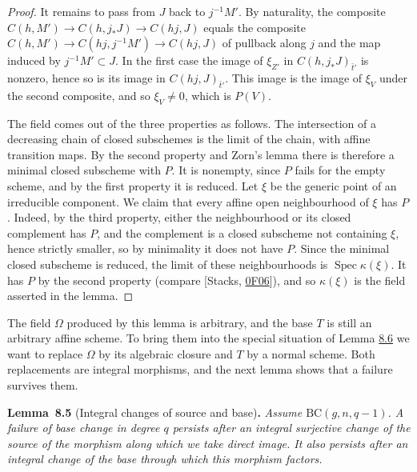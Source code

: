 \documentclass[11pt]{article}
\newenvironment{bpstatement}[2]{\par\addvspace{0.6\baselineskip}\noindent\textbf{#1}#2\textbf{.}\enspace\ignorespaces}
  {\par\addvspace{0.4\baselineskip}}
\newenvironment{bpstatementit}[2]{\begin{bpstatement}{#1}{#2}\itshape\ignorespaces}{\end{bpstatement}}
\begin{document}
\begin{proof}[{Proof}]
It remains to pass from \(J\) back to \(j^{-1}M'\). By naturality, the composite \(C(h,M')\to C(h,j_*J)\to C(hj,J)\) equals the composite \(C(h,M')\to C(hj,j^{-1}M')\to C(hj,J)\) of pullback along \(j\) and the map induced by \(j^{-1}M'\subset J\). In the first case the image of \(\xi_{Z'}\) in \(C(h,j_*J)_{\bar t'}\) is nonzero, hence so is its image in \(C(hj,J)_{\bar t'}\). This image is the image of \(\xi_V\) under the second composite, and so \(\xi_V\neq0\), which is \(P(V)\).

The field comes out of the three properties as follows. The intersection of a decreasing chain of closed subschemes is the limit of the chain, with affine transition maps. By the second property and Zorn's lemma there is therefore a minimal closed subscheme with \(P\). It is nonempty, since \(P\) fails for the empty scheme, and by the first property it is reduced. Let \(\xi\) be the generic point of an irreducible component. We claim that every affine open neighbourhood of \(\xi\) has \(P\). Indeed, by the third property, either the neighbourhood or its closed complement has \(P\), and the complement is a closed subscheme not containing \(\xi\), hence strictly smaller, so by minimality it does not have \(P\). Since the minimal closed subscheme is reduced, the limit of these neighbourhoods is \(\operatorname{Spec}\kappa(\xi)\). It has \(P\) by the second property (compare [Stacks, \href{https://stacks.math.columbia.edu/tag/0F06}{0F06}]), and so \(\kappa(\xi)\) is the field asserted in the lemma.
\end{proof}

\label{bp658}%
The field \(\Omega\) produced by this lemma is arbitrary, and the base \(T\) is still an arbitrary affine scheme. To bring them into the special situation of Lemma \hyperref[bp662]{8.6} we want to replace \(\Omega\) by its algebraic closure and \(T\) by a normal scheme. Both replacements are integral morphisms, and the next lemma shows that a failure survives them.

\label{bp659}%
\begin{bpstatementit}{Lemma~8.5}{ (Integral changes of source and base)}
Assume \(\mathrm{BC}(g,n,q-1)\). A failure of base change in degree \(q\) persists after an integral surjective change of the source of the morphism along which we take direct image. It also persists after an integral change of the base through which this morphism factors.
\end{bpstatementit}
\end{document}
